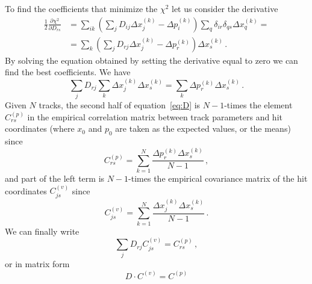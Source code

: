 \documentclass[10pt,a4paper]{report}
\begin{document}
To find the coefficients that minimize the $\chi^2$ let us consider the derivative
\begin{equation}
\begin{aligned}
\frac12\frac{\partial \chi^2}{\partial D_{rs}} &= \sum\limits_{ik}\left(\sum\limits_j D_{ij} \Delta x_j^{(k)} - \Delta p_i^{(k)}\right) \sum\limits_q\delta_{ir}\delta_{qs}\Delta x_q^{(k)} = \\
&= \sum\limits_k\left(\sum\limits_j D_{rj} \Delta x_j^{(k)} - \Delta p_r^{(k)}\right) \Delta x_s^{(k)} \, .
\end{aligned}
\end{equation}
By solving the equation obtained by setting the derivative equal to zero we can find the best coefficients. We have
\begin{equation}
\sum\limits_j D_{rj} \sum\limits_k \Delta x_j^{(k)} \Delta x_s^{(k)} = \sum\limits_k \Delta p_r^{(k)} \Delta x_s^{(k)} \, .
\label{eq:D}
\end{equation}
Given $N$ tracks, the second half of equation~\ref{eq:D} is $N-1$-times the element $C^{(p)}_{rs}$ in the empirical correlation matrix between track parameters and hit coordinates (where $x_0$ and $p_0$ are taken as the expected values, or the means) since
\begin{equation}
C^{(p)}_{rs} = \sum\limits_{k=1}^N \frac{\Delta p_r^{(k)} \Delta x_s^{(k)}}{N-1} \, ,
\end{equation}
and part of the left term is $N-1$-times the empirical covariance matrix of the hit coordinates $C^{(v)}_{js}$ since
\begin{equation}
C^{(v)}_{js} = \sum\limits_{k=1}^N \frac{\Delta x_j^{(k)} \Delta x_s^{(k)}}{N-1} \, .
\end{equation}
We can finally write
\begin{equation}
\sum\limits_j D_{rj} C^{(v)}_{js} = C^{(p)}_{rs} \, ,
\end{equation}
or in matrix form
\begin{equation}
D\cdot C^{(v)} = C^{(p)}
\end{equation}
\end{document}
